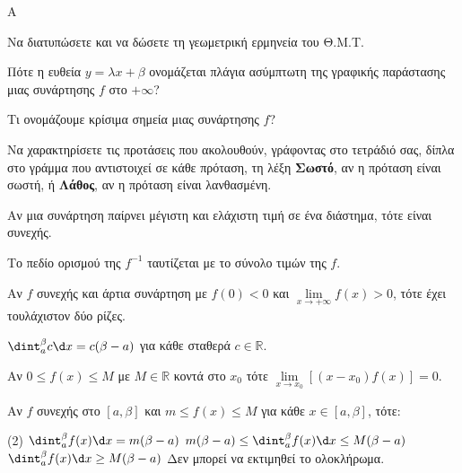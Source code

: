 \begin{thema}{A}
\begin{erwthma}
    \item Να διατυπώσετε και να δώσετε τη γεωμετρική ερμηνεία του Θ.Μ.Τ.
    \item Πότε η ευθεία $y=\lambda x+\beta$ ονομάζεται πλάγια ασύμπτωτη της γραφικής παράστασης μιας συνάρτησης $f$ στο $+\infty$?
    \item Τι ονομάζουμε κρίσιμα σημεία μιας συνάρτησης $f$?
    \item Να χαρακτηρίσετε τις προτάσεις που ακολουθούν, γράφοντας στο τετράδιό σας, δίπλα στο γράμμα που αντιστοιχεί σε κάθε πρόταση, τη λέξη \textbf{Σωστό}, αν η πρόταση είναι σωστή, ή \textbf{Λάθος}, αν η πρόταση είναι λανθασμένη.
    \begin{alist}
        \item Αν μια συνάρτηση παίρνει μέγιστη και ελάχιστη τιμή σε ένα διάστημα, τότε είναι συνεχής.
        \item Το πεδίο ορισμού της $f^{-1}$ ταυτίζεται με το σύνολο τιμών της $f$.
        \item Αν $f$ συνεχής και άρτια συνάρτηση με $f(0)<0$ και $\lim\limits_{x\to+\infty}f(x)>0$, τότε έχει τουλάχιστον δύο ρίζες.
        \item $\dint_a^\beta c \d x = c(\beta-a)$ για κάθε σταθερά $c \in \mathbb{R}$.
        \item Αν $0\leq f(x)\leq M$ με $M\in\mathbb{R}$ κοντά στο $x_0$ τότε $\lim\limits_{x\to x_0}{\left[(x-x_0)f(x)\right]}=0$.
    \end{alist}
    \item Αν $f$ συνεχής στο $[a, \beta]$ και $m \le f(x) \le M$ για κάθε $x \in [a, \beta]$, τότε:
    \begin{tasks}[label=\let\textdexiakeraia\relax\alph*.](2)
        \task $\dint_a^\beta f(x) \d x = m(\beta - a)$
        \task $m(\beta-a) \le \dint_a^\beta f(x) \d x \le M(\beta-a)$
        \task $\dint_a^\beta f(x)\d x \ge M(\beta-a)$
        \task Δεν μπορεί να εκτιμηθεί το ολοκλήρωμα.
    \end{tasks}
\end{erwthma}
\end{thema}


